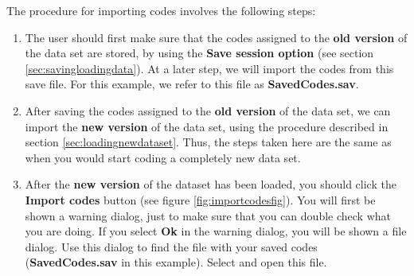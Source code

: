 \documentclass{memoir}
\begin{document}
The procedure for importing codes involves the following steps:
\begin{enumerate}
\item{The user should first make sure that the codes assigned to the \textbf{old version} of the data set are stored, by using the \textbf{Save session option} (see section \ref{sec:savingloadingdata}). At a later step, we will import the codes from this save file. For this example, we refer to this file as \textbf{Saved\textunderscore Codes.sav}.}
\item{After saving the codes assigned to the \textbf{old version} of the data set, we can import the \textbf{new version} of the data set, using the procedure described in section \ref{sec:loadingnewdataset}. Thus, the steps taken here are the same as when you would start coding a completely new data set.}
\item{After the \textbf{new version} of the dataset has been loaded, you should click the \textbf{Import codes} button (see figure \ref{fig:importcodesfig}). You will first be shown a warning dialog, just to make sure that you can double check what you are doing. If you select \textbf{Ok} in the warning dialog, you will be shown a file dialog. Use this dialog to find the file with your saved codes (\textbf{Saved\textunderscore Codes.sav} in this example). Select and open this file.}

\end{enumerate}
\end{document}
